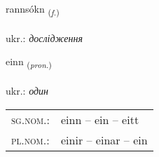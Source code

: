 \documentclass[frontgrid, backgrid]{flacards}\usepackage[]{graphicx}\usepackage[]{xcolor}
\begin{document}
{rannsókn \small{\textsubscript{(\textit{f.})}} \\[1ex] %
\textphonetic{[ransouhkn̥]} \\
ukr.: \emph{дослідження} \\  [2ex]
\renewcommand*{\arraystretch}{0.8}
}

\renewcommand{\flhead}{\vskip5pt \fboxsep=0pt {\small\bfseries\footnotesize Fornafn | займенник}}
\renewcommand{\fcfoot}{\vskip5pt \fboxsep=0pt \hspace{2pt}{\small\bfseries\footnotesize 1K}}

\renewcommand{\blhead}{\vskip5pt {\small\bfseries\footnotesize Fornafn | займенник }}
\renewcommand{\bcfoot}{\vskip5pt \hspace{2pt}{\small\bfseries\footnotesize 1K}}


{einn \small{\textsubscript{(\textit{pron.})}} \\[1ex] %
\textphonetic{[eitn̥]} \\
ukr.: \emph{один} \\  [2ex]
\renewcommand*{\arraystretch}{0.8}
\begin{tabular}{ll}
\textsc{sg.nom.}: & einn  --  ein -- eitt \\ 
\textsc{pl.nom.}: & einir -- einar -- ein
\end{tabular}
}

\renewcommand{\flhead}{\vskip5pt \fboxsep=0pt {\small\bfseries\footnotesize Lýsingarorð | прикметник}}
\renewcommand{\fcfoot}{\vskip5pt \fboxsep=0pt \hspace{2pt}{\small\bfseries\footnotesize 1K}}

\renewcommand{\blhead}{\vskip5pt {\small\bfseries\footnotesize Lýsingarorð | прикметник }}
\renewcommand{\bcfoot}{\vskip5pt \hspace{2pt}{\small\bfseries\footnotesize 1K}}
\end{document}
